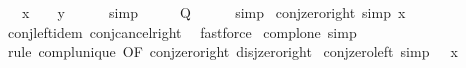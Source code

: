 \begin{isabellebody}
\ {\isacartoucheopen}\isactrlbold {\isacharminus}{\kern0pt}\ {\isacharparenleft}{\kern0pt}\isactrlbold {\isacharminus}{\kern0pt}\ x{\isacharparenright}{\kern0pt}\ {\isacharequal}{\kern0pt}\ \isactrlbold {\isacharminus}{\kern0pt}\ {\isacharparenleft}{\kern0pt}\isactrlbold {\isacharminus}{\kern0pt}\ y{\isacharparenright}{\kern0pt}{\isacartoucheclose}\isanewline
\ \ \ \ \isamarkupfalse%
\ simp\isanewline
\ \ \isamarkupfalse%
\ \isamarkupfalse%
\ {\isacharquery}{\kern0pt}Q\isanewline
\ \ \ \ \isamarkupfalse%
\ simp\isanewline
{}\isamarkupfalse%
%
\endisatagproof
{\isafoldproof}%
%
\isadelimproof
%
\endisadelimproof
%
\isadelimdocument
%
\endisadelimdocument
%
\isatagdocument
%
\isamarkuptrue%
%
\endisatagdocument
{\isafolddocument}%
%
\isadelimdocument
%
\endisadelimdocument
{}\isamarkupfalse%
\ conj{\isacharunderscore}{\kern0pt}zero{\isacharunderscore}{\kern0pt}right\ {\isacharbrackleft}{\kern0pt}simp{\isacharbrackright}{\kern0pt}{\isacharcolon}{\kern0pt}\ {\isachardoublequoteopen}x\ \isactrlbold {\isasymsqinter}\ \ {\isacharequal}{\kern0pt}\ \isanewline
%
\isadelimproof
\ \ %
\endisadelimproof
%
\isatagproof
{}\isamarkupfalse%
\ conj{\isachardot}{\kern0pt}left{\isacharunderscore}{\kern0pt}idem\ conj{\isacharunderscore}{\kern0pt}cancel{\isacharunderscore}{\kern0pt}right\ \isamarkupfalse%
\ fastforce%
\endisatagproof
{\isafoldproof}%
%
\isadelimproof
\isanewline
%
\endisadelimproof
\isanewline
{}\isamarkupfalse%
\ compl{\isacharunderscore}{\kern0pt}one\ {\isacharbrackleft}{\kern0pt}simp{\isacharbrackright}{\kern0pt}{\isacharcolon}{\kern0pt}\ {\isachardoublequoteopen}\isactrlbold {\isacharminus}{\kern0pt}\ \ {\isacharequal}{\kern0pt}\ \isanewline
%
\isadelimproof
\ \ %
\endisadelimproof
%
\isatagproof
{}\isamarkupfalse%
\ {\isacharparenleft}{\kern0pt}rule\ compl{\isacharunderscore}{\kern0pt}unique\ {\isacharbrackleft}{\kern0pt}OF\ conj{\isacharunderscore}{\kern0pt}zero{\isacharunderscore}{\kern0pt}right\ disj{\isacharunderscore}{\kern0pt}zero{\isacharunderscore}{\kern0pt}right{\isacharbrackright}{\kern0pt}{\isacharparenright}{\kern0pt}%
\endisatagproof
{\isafoldproof}%
%
\isadelimproof
\isanewline
%
\endisadelimproof
\isanewline
{}\isamarkupfalse%
\ conj{\isacharunderscore}{\kern0pt}zero{\isacharunderscore}{\kern0pt}left\ {\isacharbrackleft}{\kern0pt}simp{\isacharbrackright}{\kern0pt}{\isacharcolon}{\kern0pt}\ {\isachardoublequoteopen}\ \isactrlbold {\isasymsqinter}\ x\ {\isacharequal}{\kern0pt}\ \isanewline

\end{isabellebody}
